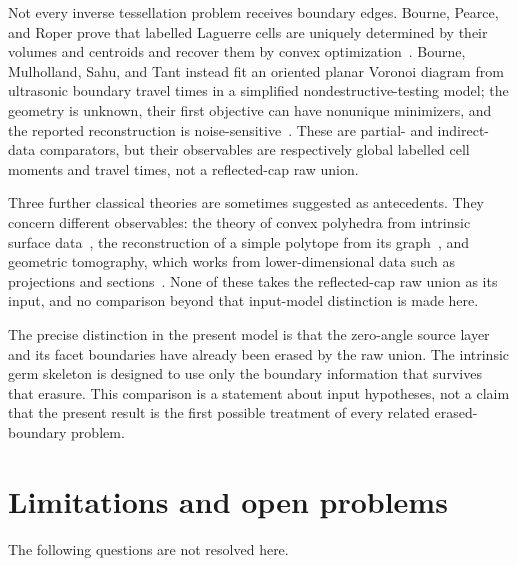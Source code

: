 \documentclass[11pt]{amsart}
\theoremstyle{definition}
\begin{document}
Not every inverse tessellation problem receives boundary edges.  Bourne,
Pearce, and Roper prove that labelled Laguerre cells are uniquely determined
by their volumes and centroids and recover them by convex
optimization~\cite{BournePearceRoper2025}.  Bourne, Mulholland, Sahu, and
Tant instead fit an oriented planar Voronoi diagram from ultrasonic boundary
travel times in a simplified nondestructive-testing model; the geometry is
unknown, their first objective can have nonunique minimizers, and the reported
reconstruction is noise-sensitive~\cite{BourneEtAl2021NDT}.  These are
partial- and indirect-data comparators, but their observables are respectively
global labelled cell moments and travel times, not a reflected-cap raw union.

Three further classical theories are sometimes suggested as antecedents.
They concern different observables: the theory of convex polyhedra from
intrinsic surface data~\cite{Alexandrov2005}, the reconstruction of a simple
polytope from its graph~\cite{BlindMani1987,Kalai1988}, and geometric
tomography, which works from lower-dimensional data such as projections and
sections~\cite{Gardner2006}.  None of these takes the reflected-cap raw union
as its input, and no comparison beyond that input-model distinction is made
here.

The precise distinction in the present model is that the zero-angle source
layer and its facet boundaries have already been erased by the raw union.  The
intrinsic germ skeleton is designed to use only the boundary information that
survives that erasure.  This comparison is a statement about input hypotheses,
not a claim that the present result is the first possible treatment of every
related erased-boundary problem.

\section{Limitations and open problems}
\label{sec:limitations}

The following questions are not resolved here.
\end{document}
